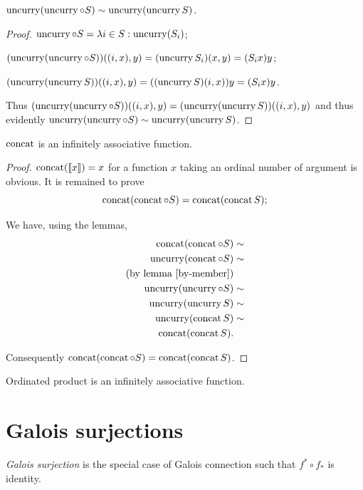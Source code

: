 \begin{lem}
$\operatorname{uncurry}(\operatorname{uncurry}\circ S)\sim\operatorname{uncurry}(\operatorname{uncurry} S)$.\end{lem}
\begin{proof}
$\operatorname{uncurry}\circ S=\lambda i\in S:\operatorname{uncurry}(S_{i})$;

$(\operatorname{uncurry}(\operatorname{uncurry}\circ S))((i,x),y)=(\operatorname{uncurry} S_{i})(x,y)=(S_{i}x)y$;

$(\operatorname{uncurry}(\operatorname{uncurry} S))((i,x),y)=((\operatorname{uncurry} S)(i,x))y=(S_{i}x)y$.

Thus $(\operatorname{uncurry}(\operatorname{uncurry}\circ S))((i,x),y)=(\operatorname{uncurry}(\operatorname{uncurry} S))((i,x),y)$
and thus evidently $\operatorname{uncurry}(\operatorname{uncurry}\circ S)\sim\operatorname{uncurry}(\operatorname{uncurry} S)$.\end{proof}
\begin{thm}
$\operatorname{concat}$ is an infinitely associative function.\end{thm}
\begin{proof}
$\operatorname{concat}(\llbracket x\rrbracket)=x$ for a function $x$ taking an
ordinal number of argument is obvious. It is remained to prove
\[
\operatorname{concat}(\operatorname{concat}\circ S)=\operatorname{concat}(\operatorname{concat} S);
\]


We have, using the lemmas,
\begin{align*}
\operatorname{concat}(\operatorname{concat}\circ S) & \sim\\
\operatorname{uncurry}(\operatorname{concat}\circ S) & \sim\\
\text{(by lemma \ref{by-member})}\\
\operatorname{uncurry}(\operatorname{uncurry}\circ S) & \sim\\
\operatorname{uncurry}(\operatorname{uncurry} S) & \sim\\
\operatorname{uncurry}(\operatorname{concat} S) & \sim\\
\operatorname{concat}(\operatorname{concat} S).
\end{align*}


Consequently $\operatorname{concat}(\operatorname{concat}\circ S)=\operatorname{concat}(\operatorname{concat} S)$.\end{proof}
\begin{cor}
Ordinated product is an infinitely associative function.
\end{cor}

\section{Galois surjections}

\begin{defn}
  \emph{Galois surjection} is the special case of Galois connection such
  that $f^{\ast} \circ f_{\ast} $ is identity.
\end{defn}

